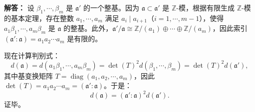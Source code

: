 \documentclass[UTF8]{ctexart}
\begin{document}
\begin{enumerate}
\textbf{解答：} 设 \(\beta_1, \cdots, \beta_m\) 是 \(\mathfrak{a}'\) 的一个整基。因为 \(\mathfrak{a} \subset \mathfrak{a}'\) 是 \(\mathbb{Z}\)-模，根据有限生成 \(\mathbb{Z}\)-模的基本定理，存在整数 \( a_1, \cdots, a_m \) 满足 \( a_i \mid a_{i+1} \)（\( i = 1, \cdots, m-1 \)），使得 \( a_1 \beta_1, \cdots, a_m \beta_m \) 是 \(\mathfrak{a}\) 的整基。此外，\(\mathfrak{a}' / \mathfrak{a} \cong \mathbb{Z}/(a_1) \oplus \cdots \oplus \mathbb{Z}/(a_m)\)，因此索引 \( (\mathfrak{a}' : \mathfrak{a}) = a_1 a_2 \cdots a_m \) 是有限的。

现在计算判别式：
\[
d(\mathfrak{a}) = d(a_1 \beta_1, \cdots, a_m \beta_m) = \det(T)^2 d(\beta_1, \cdots, \beta_m) = \det(T)^2 d(\mathfrak{a}'),
\]
其中基变换矩阵 \( T = \operatorname{diag}(a_1, a_2, \cdots, a_m) \)，因此 \(\det(T) = a_1 a_2 \cdots a_m = (\mathfrak{a}' : \mathfrak{a})\)。于是：
\[
d(\mathfrak{a}) = (\mathfrak{a}' : \mathfrak{a})^2 d(\mathfrak{a}').
\]
证毕。






\end{enumerate}
\end{document}

